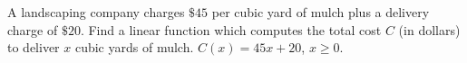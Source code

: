 {A landscaping company charges $\$45$ per cubic yard of mulch plus a delivery charge of $\$20$.  Find a linear function which computes the total cost $C$ (in dollars) to deliver $x$ cubic yards of mulch.}
{$C(x) = 45x+20$, $x \geq 0$.}